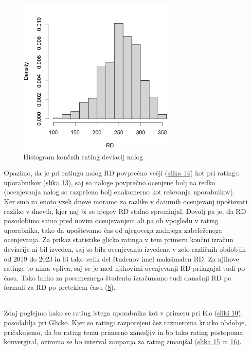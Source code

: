 \documentclass{IEEEtran}
\begin{document}
\begin{figure}[h!]
    \includegraphics[width=8cm]{GlickoExerciseRD}
    \caption{Histogram končnih rating deviacij nalog}%
    \label{fig:exerciseRD}%
\end{figure}



\newpage
Opazimo, da je pri ratingu nalog $\mathrm{RD}$ povprečno večji (\hyperref[fig:exerciseRD]{slika 14}) kot pri ratingu uporabnikov (\hyperref[fig:userRD]{slika 13}), saj so naloge povprečno ocenjene bolj na redko (ocenjevanja nalog so razpršena bolj enakomerno kot reševanja uporabnikov).
\hfill
\\

Ker smo za enoto vzeli dneve moramo za razlike v datumih ocenjevanj upoštevati razliko v dnevih, kjer naj bi se njegov $\mathrm{RD}$ stalno spreminjal. Dovolj pa je, da $\mathrm{RD}$ posodobimo samo pred novim ocenjevanjem ali pa ob vpogledu v rating uporabnika, tako da upoštevamo čas od njegovega zadnjega zabeleženega ocenjevanja. Za prikaz statistike glicko ratinga v tem primeru končni izračun deviacije ni bil izveden, saj so bila ocenjevanja izvedena v zelo različnih obdobjih od 2019 do 2023 in bi tako velik del študenov imel maksimalen $\mathrm{RD}$. Za njihove ratinge to nima vpliva, saj se je med njihovimi ocenjevanji $\mathrm{RD}$ prilagajal tudi po času. Tako lahko za posameznega študenta izračunamo tudi današnji $\mathrm{RD}$ po formuli za $\mathrm{RD}$ 
po preteklem času (\hyperref[eq:rdupdate]{8}). 

\hfill
\\
Zdaj poglejmo kako se rating istega uporabnika kot v primeru pri Elo (\hyperref[fig:uexse]{sliki 10}), posodablja pri Glicko. 
Kjer so ratingi razporejeni čez razmeroma kratko obdobje, pričakujemo, da bo rating temu primerno zanesljiv in bo tako rating postopoma konvergiral, 
oziroma se bo interval zaupanja za rating zmanjšal (\hyperref[fig:uexsg]{slika 15} in \hyperref[fig:uexsgrd]{16}). 
\end{document}
